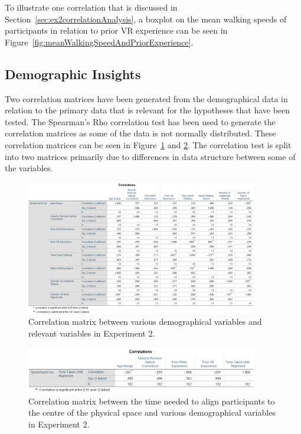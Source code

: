 To illustrate one correlation that is discussed in Section~\ref{sec:ex2correlationAnalysis}, a boxplot on the mean walking speeds of participants in relation to prior VR experience can be seen in Figure~\ref{fig:meanWalkingSpeedAndPriorExperience}.

\subsection{Demographic Insights}
Two correlation matrices have been generated from the demographical data in relation to the primary data that is relevant for the hypotheses that have been tested. The Spearman's Rho correlation test has been used to generate the correlation matrices as some of the data is not normally distributed. These correlation matrices can be seen in Figure~\ref{fig:ex2correlation1} and \ref{fig:ex2correlation2}. The correlation test is split into two matrices primarily due to differences in data structure between some of the variables. 

\begin{figure}
    \centering
    \includegraphics[width=0.9\textwidth]{figures/graphs/Ex2Correlations1.png}
    \caption[Demographical Correlation Matrix 1 for Experiment 2]{Correlation matrix between various demographical variables and relevant variables in Experiment 2.}
    \label{fig:ex2correlation1}
\end{figure}

\begin{figure}[tbph]
    \centering
    \includegraphics[width=0.9\textwidth]{figures/graphs/Ex2Correlations2.png}
    \caption[Demographical Correlation Matrix 2 for Experiment 2]{Correlation matrix between the time needed to align participants to the centre of the physical space and various demographical variables in Experiment 2.}
    \label{fig:ex2correlation2}
\end{figure}

